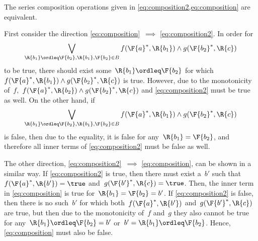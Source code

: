 \begin{remark}
  \label{lem:composition_equivalency}
  The series composition operations given in \cref{eq:composition2,eq:composition} are equivalent.

  First consider the direction \cref{eq:composition}~$\implies$ \cref{eq:composition2}. In order for%
  \begin{equation*}
    \bigvee_{\R{b_1}\ordleq\F{b_2}, \R{b_1},\F{b_2}\in B} f(\F{a}^*,\R{b_1}) \wedge g(\F{b_2}^*,\R{c})%
  \end{equation*}
  to be true, there should exist some~$\R{b_1}\ordleq \F{b_2}$ for which~$f(\F{a}^*,\R{b_1}) \wedge g(\F{b_2}^*,\R{c})$ is true. However, due to the monotonicity of~$f$,~$f(\F{a}^*,\R{b_2}) \wedge g(\F{b_2}^*,\R{c})$ and \cref{eq:composition2} must be true as well. On the other hand, if%
  \begin{equation*}
    \bigvee_{\R{b_1}\ordleq\F{b_2}, \R{b_1},\F{b_2}\in B} f(\F{a}^*,\R{b_1}) \wedge g(\F{b_2}^*,\R{c})%
  \end{equation*}
  is false, then due to the equality, it is false for any~$\R{b_1}=\F{b_2}$, and therefore all inner terms of \cref{eq:composition2} must be false as well.

  The other direction, \cref{eq:composition2}~$\implies$ \cref{eq:composition}, can be shown in a similar way. If \cref{eq:composition2} is true, then there must exist a~$b'$ such that~$f(\F{a}^*, \R{b'})=\true$ and~$g(\F{b'}^*, \R{c})=\true$. Then, the inner term in \cref{eq:composition} is true for~$\R{b_1}=\F{b_2}=b'$. If \cref{eq:composition2} is false, then there is no such~$b'$ for which both~$f(\F{a}^*, \R{b'})$ and~$g(\F{b'}^*, \R{c})$ are true, but then due to the monotonicity of~$f$ and~$g$ they also cannot be true for any~$\R{b_1} \ordleq \F{b_2} = b'$ or~$b'=\R{b_1} \ordleq \F{b_2}$. Hence, \cref{eq:composition} must also be false.
\end{remark}
